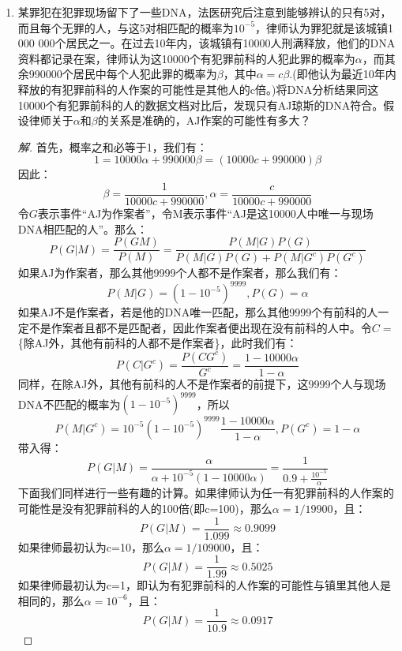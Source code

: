 \documentclass[12pt]{article}
\newcommand{\hei}{\CJKfamily{hei}}                          %
\begin{document}
\begin{enumerate}
\item {\hei 某罪犯在犯罪现场留下了一些DNA，法医研究后注意到能够辨认的只有5对，而且每个无罪的人，与这5对相匹配的概率为$10^{-5}$，律师认为罪犯就是该城镇1 000 000个居民之一。在过去10年内，该城镇有10000人刑满释放，他们的DNA资料都记录在案，律师认为这10000个有犯罪前科的人犯此罪的概率为$\alpha$，而其余990000个居民中每个人犯此罪的概率为$\beta$，其中$\alpha=c\beta$.(即他认为最近10年内释放的有犯罪前科的人作案的可能性是其他人的c倍。)将DNA分析结果同这10000个有犯罪前科的人的数据文档对比后，发现只有AJ琼斯的DNA符合。假设律师关于$\alpha$和$\beta$的关系是准确的，AJ作案的可能性有多大？}
\begin{proof}[解]
	首先，概率之和必等于1，我们有：
	\begin{equation}
	1=10000\alpha+990000\beta=(10000c+990000)\beta
	\end{equation}
	因此：
	\begin{equation}
	\beta=\frac{1}{10000c+990000},\alpha=\frac{c}{10000c+990000}
	\end{equation}
	令$G$表示事件“AJ为作案者”，令M表示事件“AJ是这10000人中唯一与现场DNA相匹配的人”。那么：
	\begin{equation}
	P(G|M)=\frac{P(GM)}{P(M)}=\frac{P(M|G)P(G)}{P(M|G)P(G)+P(M|G^c)P(G^c)}
	\end{equation}
	如果AJ为作案者，那么其他9999个人都不是作案者，那么我们有：
	\begin{equation}
	P(M|G)=(1-10^{-5})^{9999},P(G)=\alpha
	\end{equation}
	如果AJ不是作案者，若是他的DNA唯一匹配，那么其他9999个有前科的人一定不是作案者且都不是匹配者，因此作案者便出现在没有前科的人中。令$C=$\{除AJ外，其他有前科的人都不是作案者\}，此时我们有：
	\begin{equation}
	P(C|G^c)=\frac{P(CG^c)}{G^c}=\frac{1-10000\alpha}{1-\alpha}
	\end{equation}
	同样，在除AJ外，其他有前科的人不是作案者的前提下，这9999个人与现场DNA不匹配的概率为$(1-10^{-5})^{9999}$，所以
	\begin{equation}
	P(M|G^c)=10^{-5}(1-10^{-5})^{9999}\frac{1-10000\alpha}{1-\alpha},P(G^c)=1-\alpha
	\end{equation}
	带入得：
	\begin{equation}
	P(G|M)=\frac{\alpha}{\alpha+10^{-5}(1-10000\alpha)}=\frac{1}{0.9+\frac{10^{-5}}{\alpha}}
	\end{equation}
	下面我们同样进行一些有趣的计算。如果律师认为任一有犯罪前科的人作案的可能性是没有犯罪前科的人的100倍(即c=100)，那么$\alpha=1/19900$，且：
	\begin{equation}
	P(G|M)=\frac{1}{1.099}\approx 0.9099
	\end{equation}
	如果律师最初认为c=10，那么$\alpha=1/109000$，且：
	\begin{equation}
	P(G|M)=\frac{1}{1.99}\approx 0.5025
	\end{equation}
	如果律师最初认为c=1，即认为有犯罪前科的人作案的可能性与镇里其他人是相同的，那么$\alpha=10^{-6}$，且：
	\begin{equation}
	P(G|M)=\frac{1}{10.9}\approx 0.0917
	\end{equation}
\end{proof}


\end{enumerate}
\end{document}
